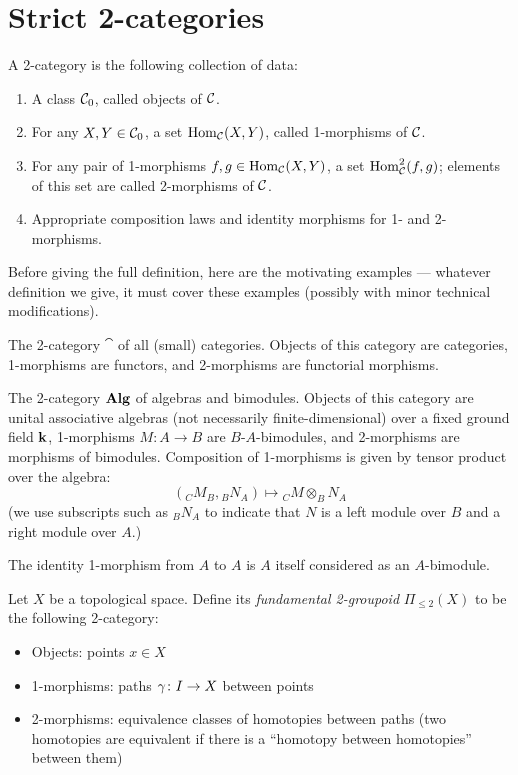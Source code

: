 \section{Strict 2-categories}\label{s:2cat-strict}
\begin{predefinition}\label{d:2-cat-prelim}
  A 2-category is the following collection of data:
  \begin{enumerate}
    \item A class $\mathcal{C}_0$, called objects of $\mathcal{C}$.
    \item For any $X,Y\in \mathcal{C}_0$, a set $\operatorname{Hom}_{\mathcal{C}}(X,Y)$,
    called 1-morphisms of $\mathcal{C}$.
    \item For any pair of 1-morphisms $f,g\in \operatorname{Hom}_{\mathcal{C}}(X,Y)$, a set
      $\operatorname{Hom}^2_{\mathcal{C}}(f,g)$; elements of this set are called
      2-morphisms of $\mathcal{C}$.
    \item Appropriate composition laws and identity morphisms for 1-
      and 2-morphisms.
  \end{enumerate}
\end{predefinition}
Before giving the full definition, here are the motivating examples ---
whatever definition we give, it must cover these examples (possibly with minor
technical modifications).

\begin{example}\label{x:cat}
  The 2-category $\cat$ of all (small) categories. Objects of this category are
  categories, 1-morphisms are functors, and 2-morphisms are functorial
  morphisms.
\end{example}
\begin{example} \label{x:alg}
  The 2-category $\mathbf{Alg}$ of algebras and bimodules. Objects of this category are
  unital associative algebras (not necessarily finite-dimensional) over a fixed
  ground field $\mathbf{k}$, 1-morphisms $M\colon A\to B$ are $B$-$A$-bimodules,
  and 2-morphisms are morphisms of bimodules. Composition of 1-morphisms
  is given by tensor product over the algebra:
  $$
  ({}_CM_B, {}_BN_A)\mapsto {}_C M\otimes_B N_A
  $$
  (we use subscripts such as ${}_BN_A$ to indicate that $N$ is a left module
  over $B$ and a right module over $A$.)

  The identity 1-morphism from $A$ to $A$ is $A$ itself considered as an
  $A$-bimodule.
\end{example}
\begin{example} \label{x:2groupoid}
  Let $X$ be a topological space. Define its \emph{fundamental
  2-groupoid} $\Pi_{\leq 2}(X)$ to be the
  following 2-category:
  \begin{itemize}
    \item Objects: points $x\in X$
    \item 1-morphisms: paths $\gamma\colon I \to X$ between points
    \item 2-morphisms: equivalence classes of homotopies between paths
          (two homotopies are equivalent if there is a ``homotopy between
          homotopies'' between them)
  \end{itemize}
\end{example}

